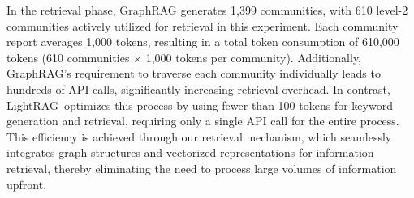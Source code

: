 \documentclass{article} %
\def\model{LightRAG}
\begin{document}
In the retrieval phase, GraphRAG generates 1,399 communities, with 610 level-2 communities actively utilized for retrieval in this experiment. Each community report averages 1,000 tokens, resulting in a total token consumption of 610,000 tokens (610 communities $\times$ 1,000 tokens per community). Additionally, GraphRAG's requirement to traverse each community individually leads to hundreds of API calls, significantly increasing retrieval overhead. In contrast, \model\ optimizes this process by using fewer than 100 tokens for keyword generation and retrieval, requiring only a single API call for the entire process. This efficiency is achieved through our retrieval mechanism, which seamlessly integrates graph structures and vectorized representations for information retrieval, thereby eliminating the need to process large volumes of information upfront.
\end{document}
